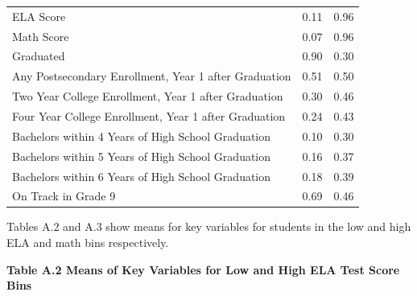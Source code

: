 \documentclass[12pt]{article}
\theoremstyle{definition}
\theoremstyle{definition}
\theoremstyle{definition}
\theoremstyle{definition}
\begin{document}
\begin{table}[]
\begin{tabular}{lll}
ELA Score                                               & 0.11    & 0.96      \\
Math Score                                              & 0.07    & 0.96      \\
Graduated                                               & 0.90    & 0.30      \\
Any Postsecondary Enrollment,   Year 1 after Graduation & 0.51    & 0.50      \\
Two Year College Enrollment,   Year 1 after Graduation  & 0.30    & 0.46      \\
Four Year College Enrollment,   Year 1 after Graduation & 0.24    & 0.43      \\
Bachelors within 4 Years of   High School Graduation    & 0.10    & 0.30      \\
Bachelors within 5 Years of   High School Graduation    & 0.16    & 0.37      \\
Bachelors within 6 Years of   High School Graduation    & 0.18    & 0.39      \\
On Track in Grade 9                                     & 0.69    & 0.46     
\end{tabular}
\end{table}

\pagebreak

Tables A.2 and A.3 show means for key variables for students in the low and high ELA and math bins respectively. 

\textbf{Table A.2 Means of Key Variables for Low and High ELA Test Score Bins}
\end{document}

